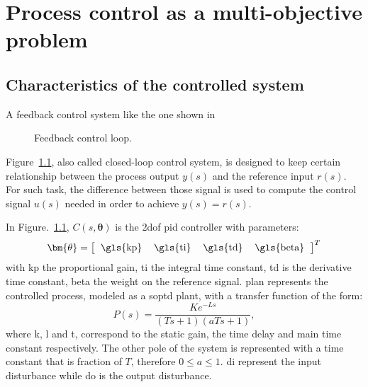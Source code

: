 \chapter{Process control as a multi-objective problem}
\label{chap:PromContr}
\section{Characteristics of the controlled system}
\label{sec:CaracControl}
A feedback control system like the one shown in %
\begin{figure}%
	\centering
	\caption{Feedback control loop.}%
	\label{fig:bloques}%
\end{figure}
%
Figure~\ref{fig:bloques}, also called closed-loop control system, is designed to keep certain relationship between the process output $y(s)$ and the reference input $r(s)$. For such task, the difference between those signal is used to compute the control signal $u(s)$ needed in order to achieve $y(s)=r(s)$. 

In Figure.~\ref{fig:bloques}, $C(s,\bm{\theta})$ is the \gls{2dof} \gls{pid} controller with parameters:
\begin{equation*}
\bm{\theta}=\left[	\begin{tabular}{cccc} \gls{kp} & \gls{ti} & \gls{td} & \gls{beta}	\end{tabular}\right]^T
\end{equation*}
%
with \gls{kp} the proportional gain, \gls{ti} the integral time constant, \gls{td} is the derivative time constant, \gls{beta} the weight on the reference signal. \gls{plan} represents the controlled process, modeled as a \gls{soptd} plant, with a transfer function of the form:
\begin{equation}  %
P(s) =  \frac{K e^{-Ls}}{(T s+1)(a T s+1)},
\label{eq:plantaX}
\end{equation}
%
where \gls{k}, \gls{l} and \gls{t}, correspond to the static gain, the time delay and main time constant respectively. The other pole of the system is represented with a time constant that is fraction of $T$, therefore $0 \leq a \leq 1$. \gls{di} represent the input disturbance while \gls{do} is the output disturbance.

